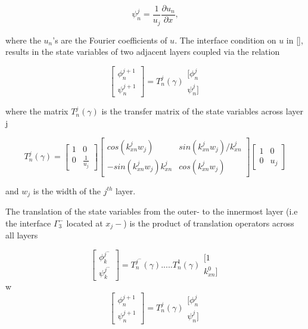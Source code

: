 \begin{equation}
\psi_n^j = \frac{1}{u_j} \frac{\partial{u_n}}{\partial{x}},
\end{equation}

where the $u_n$'s are the Fourier coefficients of $u$. The interface
condition on $u$ in \ref{}, results in the state variables of two
adjacent layers coupled via the relation

\begin{equation}
\left[ \begin{array}{ll} \phi_n^{j+1} \\ \psi_n^{j+1}
\end{array} \right] = T_n^j(\gamma)
\begin{array}{ll} [\phi_n^{j} \\ \psi_n^{j}] \end{array}
\end{equation}

where the matrix $T_n^j(\gamma)$ is the transfer matrix of the state
variables across layer j

\begin{equation}
T_n^j(\gamma) = \left[ \begin{array}{cc} 1 & 0 \\
0 & \frac{1}{u_j} \end{array} \right]
\left[ \begin{array}{cc}  cos(k_{xn}^j w_j) & sin(k_{xn}^j
 w_j)/k_{xn}^j \\
-sin(k_{xn}^j w_j) k_{xn}^j & cos(k_{xn}^j w_j) \end{array}
\right]\left[ \begin{array}{cc} 1 & 0 \\
0 & u_j \end{array} \right]
\end{equation}

and $w_j$ is the width of the $j^{th}$ layer.

The translation of the state variables from the outer- to the
innermost layer (i.e the interface $\Gamma_3^-$ located at $x_j-$) is
the product of translation operators across all layers

\begin{equation}
\left[ \begin{array}{ll} \phi_k^{j^-} \\ \psi_k^{j^-}
\end{array} \right] = T_n^{j^-}(\gamma) ..... T_n^1(\gamma)
\begin{array}{ll} [1 \\ k_{xn}^0] \end{array}
\end{equation}
w\begin{equation}
\left[ \begin{array}{ll} \phi_n^{j+1} \\ \psi_n^{j+1}
\end{array} \right] = T_n^j(\gamma)
\begin{array}{ll} [\phi_n^{j} \\ \psi_n^{j}] \end{array}
\end{equation}

